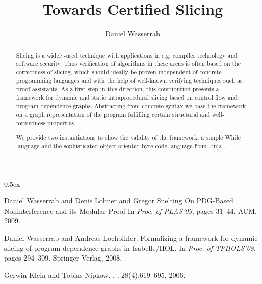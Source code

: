 \documentclass[11pt,a4paper,notitlepage]{report}
\begin{document}
\title{Towards Certified Slicing}
\author{Daniel Wasserrab}
\maketitle

\begin{abstract}
Slicing is a widely-used technique with applications in e.g. compiler
technology and software security. Thus verification of
algorithms in these areas is often based on the correctness of slicing,
which should ideally be proven independent of concrete programming
languages and with the help of well-known verifying techniques such as
proof assistants. As a first step in this direction, this contribution
presents a framework for dynamic \cite{WasserrabL:08} 
and static intraprocedural slicing \cite{WasserrabLS:09}
based on control flow and program dependence graphs.
Abstracting from concrete syntax we base the framework on a graph
representation of the program fulfilling certain structural
and well-formedness properties.

We provide two instantiations to show the validity of the framework:
a simple While language and the sophisticated object-oriented byte code
language from Jinja \cite{KleinN:06}. 
\end{abstract}

\parindent 0pt\parskip 0.5ex



\begin{thebibliography}{10}

Daniel Wasserrab and Denis Lohner and Gregor Snelting
\newblock On PDG-Based Noninterference and its Modular Proof
\newblock In {\em Proc. of PLAS'09}, pages 31--44. ACM, 2009.

Daniel Wasserrab and Andreas Lochbihler.
\newblock Formalizing a framework for dynamic slicing of program dependence
  graphs in {Isabelle/HOL}.
\newblock In {\em Proc. of TPHOLS'08}, pages 294--309. Springer-Verlag, 2008.

Gerwin Klein and Tobias Nipkow.
.
,
  28(4):619--695, 2006.

\end{thebibliography}
\end{document}

